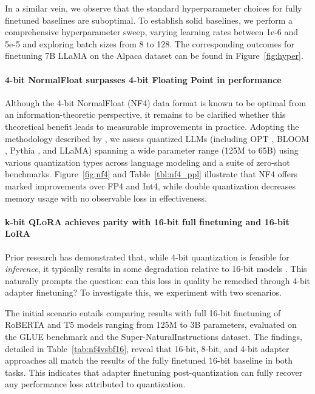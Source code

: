 In a similar vein, we observe that the standard hyperparameter choices for fully finetuned baselines are suboptimal. To establish solid baselines, we perform a comprehensive hyperparameter sweep, varying learning rates between 1e-6 and 5e-5 and exploring batch sizes from 8 to 128. The corresponding outcomes for finetuning 7B LLaMA on the Alpaca dataset can be found in Figure~\ref{fig:hyper}.

\paragraph{4-bit NormalFloat surpasses 4-bit Floating Point in performance} 

Although the 4-bit NormalFloat (NF4) data format is known to be optimal from an information-theoretic perspective, it remains to be clarified whether this theoretical benefit leads to measurable improvements in practice. Adopting the methodology described by \citet{dettmers2022case}, we assess quantized LLMs (including OPT \citep{zhang2022opt}, BLOOM \cite{scao2022bloom}, Pythia \cite{biderman2023pythia}, and LLaMA) spanning a wide parameter range (125M to 65B) using various quantization types across language modeling and a suite of zero-shot benchmarks. Figure~\ref{fig:nf4} and Table~\ref{tbl:nf4_ppl} illustrate that NF4 offers marked improvements over FP4 and Int4, while double quantization decreases memory usage with no observable loss in effectiveness.

\paragraph{k-bit \textsc{QLoRA} achieves parity with 16-bit full finetuning and 16-bit LoRA}

Prior research has demonstrated that, while 4-bit quantization is feasible for \emph{inference}, it typically results in some degradation relative to 16-bit models \citep{dettmers2022case,frantar2022gptq}. This naturally prompts the question: can this loss in quality be remedied through 4-bit adapter finetuning? To investigate this, we experiment with two scenarios.

The initial scenario entails comparing results with full 16-bit finetuning of RoBERTA and T5 models ranging from 125M to 3B parameters, evaluated on the GLUE benchmark and the Super-NaturalInstructions dataset. The findings, detailed in Table~\ref{tab:nf4vsbf16}, reveal that 16-bit, 8-bit, and 4-bit adapter approaches all match the results of the fully finetuned 16-bit baseline in both tasks. This indicates that adapter finetuning post-quantization can fully recover any performance loss attributed to quantization.

